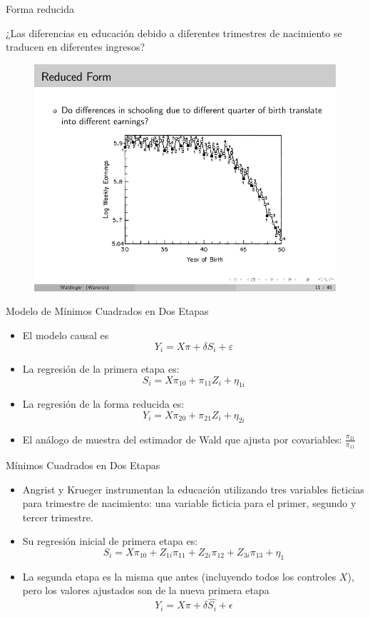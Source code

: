 \documentclass{beamer}
\begin{document}
\begin{frame}{Forma reducida}
	
	¿Las diferencias en educación debido a diferentes trimestres de nacimiento se traducen en diferentes ingresos?
	
	\begin{figure}
	\includegraphics{./lecture_includes/qob_3.pdf}
	\end{figure}
	
\end{frame}

\begin{frame}{Modelo de Mínimos Cuadrados en Dos Etapas}
	
	\begin{itemize}
	\item El modelo causal es $$Y_i = X \pi + \delta S_i + \varepsilon$$
	\item La regresión de la primera etapa es: $$S_i=X\pi_{10} + \pi_{11}Z_i + \eta_{1i}$$
	\item La regresión de la forma reducida es: $$Y_i=X\pi_{20} + \pi_{21}Z_i+\eta_{2i}$$
	\item El análogo de muestra del estimador de Wald que ajusta por covariables: $\frac{\pi_{21}}{\pi_{11}}$
	\end{itemize}

\end{frame}

\begin{frame}{Mínimos Cuadrados en Dos Etapas}
	
	\begin{itemize}
	\item Angrist y Krueger instrumentan la educación utilizando tres variables ficticias para trimestre de nacimiento: una variable ficticia para el primer, segundo y tercer trimestre.
	\item Su regresión inicial de primera etapa es: $$S_i=X\pi_{10} + Z_{1i}\pi_{11} + Z_{2i}\pi_{12} + Z_{3i}\pi_{13}+\eta_1$$
	\item La segunda etapa es la misma que antes (incluyendo todos los controles $X$), pero los valores ajustados son de la nueva primera etapa $$Y_i = X \pi + \delta \widehat{S_i} + \epsilon$$
	\end{itemize}

\end{frame}
\end{document}
